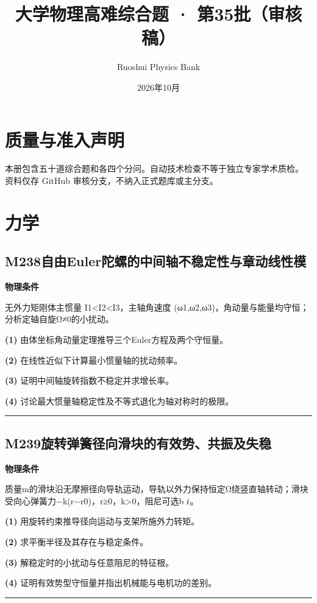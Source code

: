 \documentclass[UTF8,a4paper,11pt,oneside,openany]{ctexbook}
\begin{document}
\title{大学物理高难综合题 · 第35批（审核稿）}
\author{Ruoshui Physics Bank}
\date{2026年10月}
\maketitle
\tableofcontents
\chapter*{质量与准入声明}
本册包含五十道综合题和各四个分问。自动技术检查不等于独立专家学术质检。
资料仅存 GitHub 审核分支，不纳入正式题库或主分支。

\chapter{力学}
\section*{M238\quad 自由Euler陀螺的中间轴不稳定性与章动线性模}
\textbf{物理条件}\par 无外力矩刚体主惯量 I1<I2<I3，主轴角速度 (ω1,ω2,ω3)，角动量与能量均守恒；分析定轴自旋Ω≠0的小扰动。
\par\noindent\textbf{(1)} 由体坐标角动量定理推导三个Euler方程及两个守恒量。
\par\noindent\textbf{(2)} 在线性近似下计算最小惯量轴的扰动频率。
\par\noindent\textbf{(3)} 证明中间轴旋转指数不稳定并求增长率。
\par\noindent\textbf{(4)} 讨论最大惯量轴稳定性及不等式退化为轴对称时的极限。

\par\bigskip\hrule\bigskip
\section*{M239\quad 旋转弹簧径向滑块的有效势、共振及失稳}
\textbf{物理条件}\par 质量m的滑块沿无摩擦径向导轨运动，导轨以外力保持恒定Ω绕竖直轴转动；滑块受向心弹簧力−k(r−r0)，r≥0，k>0，阻尼可选b ṙ。
\par\noindent\textbf{(1)} 用旋转约束推导径向运动与支架所施外力转矩。
\par\noindent\textbf{(2)} 求平衡半径及其存在与稳定条件。
\par\noindent\textbf{(3)} 解稳定时的小扰动与任意阻尼的特征根。
\par\noindent\textbf{(4)} 证明有效势型守恒量并指出机械能与电机功的差别。

\par\bigskip\hrule\bigskip
\end{document}
